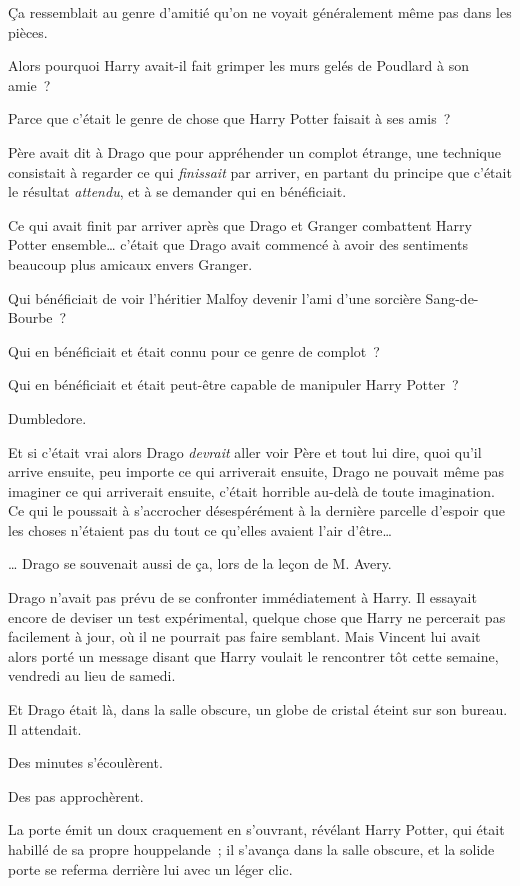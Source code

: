 Ça ressemblait au genre d'amitié qu'on ne voyait généralement même pas dans les pièces.

Alors pourquoi Harry avait-il fait grimper les murs gelés de Poudlard à son amie~?

Parce que c'était le genre de chose que Harry Potter faisait à ses amis~?

Père avait dit à Drago que pour appréhender un complot étrange, une technique consistait à regarder ce qui \emph{finissait} par arriver, en partant du principe que c'était le résultat \emph{attendu}, et à se demander qui en bénéficiait.

Ce qui avait finit par arriver après que Drago et Granger combattent Harry Potter ensemble… c'était que Drago avait commencé à avoir des sentiments beaucoup plus amicaux envers Granger.

Qui bénéficiait de voir l'héritier Malfoy devenir l'ami d'une sorcière Sang-de-Bourbe~?

Qui en bénéficiait et était connu pour ce genre de complot~?

Qui en bénéficiait et était peut-être capable de manipuler Harry Potter~?

Dumbledore.

Et si c'était vrai alors Drago \emph{devrait} aller voir Père et tout lui dire, quoi qu'il arrive ensuite, peu importe ce qui arriverait ensuite, Drago ne pouvait même pas imaginer ce qui arriverait ensuite, c'était horrible au-delà de toute imagination. Ce qui le poussait à s'accrocher désespérément à la dernière parcelle d'espoir que les choses n'étaient pas du tout ce qu'elles avaient l'air d'être…

… Drago se souvenait aussi de ça, lors de la leçon de M. Avery.

Drago n'avait pas prévu de se confronter immédiatement à Harry. Il essayait encore de deviser un test expérimental, quelque chose que Harry ne percerait pas facilement à jour, où il ne pourrait pas faire semblant. Mais Vincent lui avait alors porté un message disant que Harry voulait le rencontrer tôt cette semaine, vendredi au lieu de samedi.

Et Drago était là, dans la salle obscure, un globe de cristal éteint sur son bureau. Il attendait.

Des minutes s'écoulèrent.

Des pas approchèrent.

La porte émit un doux craquement en s'ouvrant, révélant Harry Potter, qui était habillé de sa propre houppelande~; il s'avança dans la salle obscure, et la solide porte se referma derrière lui avec un léger clic.

